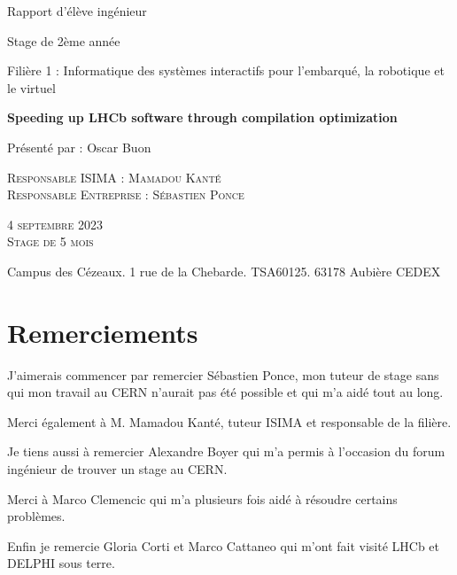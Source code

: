 \documentclass[a4paper,11pt]{report}
\begin{document}
\begin{titlepage}
    \vfill

    {\Large
        Rapport d'élève ingénieur \par
        Stage de 2ème année \par
        Filière 1 : Informatique des systèmes interactifs pour l’embarqué, la robotique et le virtuel \par
    }

    \vfill

    {\huge\bfseries Speeding up LHCb software through compilation optimization \par}

    \vfill

    {\Large Présenté par : Oscar Buon \par}

    \vfill

    \begin{minipage}{0.65\textwidth}
        \textsc{Responsable ISIMA : Mamadou Kanté}\\
        \textsc{Responsable Entreprise : Sébastien Ponce}\\
    \end{minipage}
    \hfill
    \begin{minipage}{0.25\textwidth}
        \textsc{4 septembre 2023} \\
        \textsc{Stage de 5 mois} \\
    \end{minipage}

    \vfill

    Campus des Cézeaux. 1 rue de la Chebarde. TSA60125. 63178 Aubière CEDEX
\end{titlepage}


\chapter*{Remerciements}
J'aimerais commencer par remercier Sébastien Ponce, mon tuteur de stage sans qui mon travail au CERN n'aurait pas été possible et qui m'a aidé tout au long.

Merci également à M. Mamadou Kanté, tuteur ISIMA et responsable de la filière.

\bigskip
Je tiens aussi à remercier Alexandre Boyer qui m'a permis à l'occasion du forum ingénieur de trouver un stage au CERN.

\bigskip
Merci à Marco Clemencic qui m'a plusieurs fois aidé à résoudre certains problèmes.

\bigskip
Enfin je remercie Gloria Corti et Marco Cattaneo qui m'ont fait visité LHCb et DELPHI sous terre.
\end{document}
